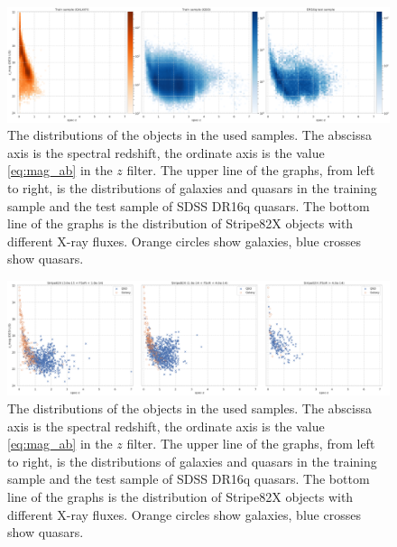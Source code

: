 \documentclass[fleqn,usenatbib]{mnras}
\begin{document}
\begin{figure}
    \centering
    \includegraphics[width=0.95\linewidth]{images/data-dist-ab-upsidedown-dr16.png}
    \caption{The distributions of the objects in the used samples. The abscissa axis is the spectral redshift, the ordinate axis is the value \eqref{eq:mag_ab} in the $z$ filter. The upper line of the graphs, from left to right, is the distributions of galaxies and quasars in the training sample and the test sample of SDSS DR16q quasars.  The bottom line of the graphs is the distribution of Stripe82X objects with different X-ray fluxes. Orange circles show galaxies, blue crosses show quasars.}
    \label{fig:data_distribution}
\end{figure}

\begin{figure}
    \centering
    \includegraphics[width=0.95\linewidth]{images/data-dist-ab-upsidedown-s82x.png}
    \caption{The distributions of the objects in the used samples. The abscissa axis is the spectral redshift, the ordinate axis is the value \eqref{eq:mag_ab} in the $z$ filter. The upper line of the graphs, from left to right, is the distributions of galaxies and quasars in the training sample and the test sample of SDSS DR16q quasars.  The bottom line of the graphs is the distribution of Stripe82X objects with different X-ray fluxes. Orange circles show galaxies, blue crosses show quasars.}
    \label{fig:data_distribution}
\end{figure}

\end{document}
